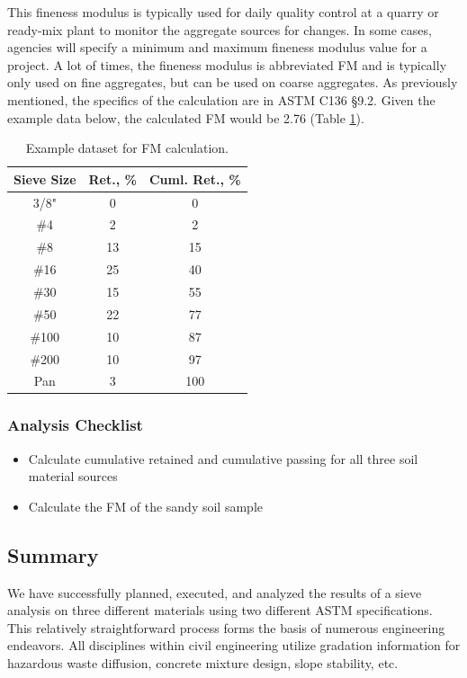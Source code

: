 \documentclass[12pt]{article}
\begin{document}
This fineness modulus is typically used for daily quality control at a quarry or ready-mix plant to monitor the aggregate sources for changes. In some cases, agencies will specify a minimum and maximum fineness modulus value for a project. A lot of times, the fineness modulus is abbreviated FM and is typically only used on fine aggregates, but can be used on coarse aggregates. As previously mentioned, the specifics of the calculation are in ASTM C136 \S9.2. Given the example data below, the calculated FM would be 2.76 (Table \ref{tab:FM}).

\begin{table}[H]
    \centering
        \caption{Example dataset for FM calculation.}
    \label{tab:FM}
    \begin{tabular}{ccc}
\hline
Sieve Size & Ret., \% & Cuml. Ret., \% \\ \hline
3/8" & 0 & 0 \\
\#4 & 2 & 2 \\
\#8 & 13 & 15 \\
\#16 & 25 & 40 \\
\#30 & 15 & 55 \\
\#50 & 22 & 77 \\
\#100 & 10 & 87 \\
\#200 & 10 & 97 \\
Pan & 3 & 100 \\ \hline
\end{tabular}
\end{table}

\subsubsection*{Analysis Checklist}
\begin{itemize}
    \item Calculate cumulative retained and cumulative passing for all three soil material sources
    \item Calculate the FM of the sandy soil sample
\end{itemize}

\subsection{Summary}
We have successfully planned, executed, and analyzed the results of a sieve analysis on three different materials using two different ASTM specifications. This relatively straightforward process forms the basis of numerous engineering endeavors. All disciplines within civil engineering utilize gradation information for hazardous waste diffusion, concrete mixture design, slope stability, etc.
\end{document}
